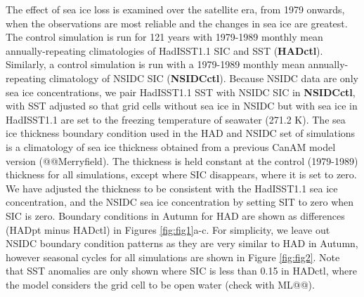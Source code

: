 \documentclass[twocol]{ametsoc}
\begin{document}
The effect of sea ice loss is examined over the satellite era, from 1979 onwards, when the observations are most reliable and the changes in sea ice are greatest. The control simulation is run for 121 years with 1979-1989 monthly mean annually-repeating climatologies of HadISST1.1 SIC and SST (\textbf{HADctl}). Similarly, a control simulation is run with a 1979-1989 monthly mean annually-repeating climatology of NSIDC SIC (\textbf{NSIDCctl}). Because NSIDC data are only sea ice concentrations, we pair HadISST1.1 SST with NSIDC SIC in \textbf{NSIDCctl}, with SST adjusted so that grid cells without sea ice in NSIDC but with sea ice in HadISST1.1 are set to the freezing temperature of seawater (271.2 K). The sea ice thickness boundary condition used in the HAD and NSIDC set of simulations is a climatology of sea ice thickness obtained from a previous CanAM model version (@@Merryfield). The thickness is held constant at the control (1979-1989) thickness for all simulations, except where SIC disappears, where it is set to zero. We have adjusted the thickness to be consistent with the HadISST1.1 sea ice concentration, and the NSIDC sea ice concentration by setting SIT to zero when SIC is zero. Boundary conditions in Autumn for HAD are shown as differences (HADpt minus HADctl) in Figures \ref{fig:fig1}a-c. For simplicity, we leave out NSIDC boundary condition patterns as they are very similar to HAD in Autumn, however seasonal cycles for all simulations are shown in Figure \ref{fig:fig2}. Note that SST anomalies are only shown where SIC is less than 0.15 in HADctl, where the model considers the grid cell to be open water (check with ML@@).




\end{document}
